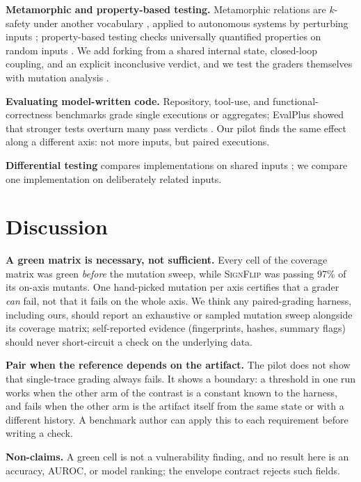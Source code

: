 \documentclass[conference]{IEEEtran}
\begin{document}
	\textbf{Metamorphic and property-based testing.} Metamorphic relations
	are $k$-safety under another vocabulary \cite{chen1998,segura2016},
	applied to autonomous systems by perturbing inputs \cite{tian2018};
	property-based testing checks universally quantified properties on
	random inputs \cite{claessen2000}. We add forking from a shared internal
	state, closed-loop coupling, and an explicit inconclusive verdict, and we
	test the graders themselves with mutation analysis \cite{jia2011}.
	
	\textbf{Evaluating model-written code.} Repository, tool-use, and
	functional-correctness benchmarks
	\cite{jimenez2024,yao2024,liu2023,zhou2024,chen2021} grade single
	executions or aggregates; EvalPlus showed that stronger tests overturn
	many pass verdicts \cite{liu2023evalplus}. Our pilot finds the same
	effect along a different axis: not more inputs, but paired executions.
	
	\textbf{Differential testing} compares implementations on shared inputs
	\cite{mckeeman1998}; we compare one implementation on deliberately
	related inputs.
	
	\section{Discussion}
	\label{sec:discussion}
	
	\textbf{A green matrix is necessary, not sufficient.} Every cell of
	the coverage matrix was green \emph{before} the mutation sweep, while
	\textsc{SignFlip} was passing 97\% of its on-axis mutants. One hand-picked
	mutation per axis certifies that a grader \emph{can} fail, not that it
	fails on the whole axis. We think any paired-grading harness, including
	ours, should report an exhaustive or sampled mutation sweep alongside its
	coverage matrix; self-reported evidence (fingerprints, hashes, summary
	flags) should never short-circuit a check on the underlying data.
	
	\textbf{Pair when the reference depends on the artifact.} The pilot does
	not show that single-trace grading always fails. It shows a boundary: a
	threshold in one run works when the other arm of the contrast is a
	constant known to the harness, and fails when the other arm is the
	artifact itself from the same state or with a different history. A
	benchmark author can apply this to each requirement before writing a
	check.
	
	\textbf{Non-claims.} A green cell is not a vulnerability finding, and no
	result here is an accuracy, AUROC, or model ranking; the envelope
	contract rejects such fields.
	
\end{document}
